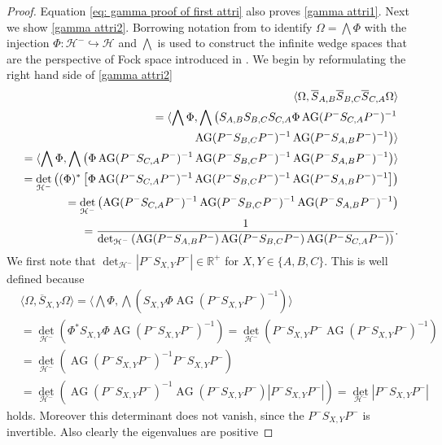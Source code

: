 \documentclass[b5paper,draft,openbib,12pt]{memoir}
\DeclareMathOperator{\AG}{AG}
\begin{document}
\begin{proof}
 Equation 
\eqref{eq: gamma proof of first attri} also proves \eqref{gamma attri1}. Next we show \eqref{gamma attri2}. 
Borrowing notation from \cite[section 2]{ivp0} to identify \(\Omega=\bigwedge \Phi\) with the injection \(\Phi: \mathcal{H}^-\hookrightarrow\mathcal{H}\)
and \(\bigwedge\) is used to construct the infinite wedge spaces that are the perspective of Fock space introduced in \cite{ivp0}. 
We begin by reformulating the right hand side of  \eqref{gamma attri2}
\begin{align}
 \langle \Omega, \overline{S}_{A,B} \overline{S}_{B,C} \overline{S}_{C,A}\Omega\rangle \\\notag
=\langle \bigwedge \Phi, \bigwedge \left(S_{A,B}S_{B,C}S_{C,A}\Phi \AG(P^-S_{C,A} P^-)^{-1}\right.\\
\left. \AG(P^-S_{B,C} P^-)^{-1} \AG(P^-S_{A,B} P^-)^{-1}  \right)\rangle \\
=\langle \bigwedge \Phi, \bigwedge \left(\Phi \AG(P^-S_{C,A} P^-)^{-1} \AG(P^-S_{B,C} P^-)^{-1} \AG(P^-S_{A,B} P^-)^{-1}  \right)\rangle \\
=\det_{\mathcal{H}^-}\left( (\Phi)^*  \left[\Phi \AG(P^- S_{C,A} P^-)^{-1} \AG(P^-S_{B,C} P^-)^{-1} \AG(P^-S_{A,B} P^-)^{-1} \right] \right)\\
=\det_{\mathcal{H}^-}\left(  \AG(P^- S_{C,A} P^-)^{-1} \AG(P^- S_{B,C} P^-)^{-1} \AG(P^-S_{A,B} P^-)^{-1}  \right)\\\label{eq:1/arg}
=\frac{1}{\det_{\mathcal{H}^-}\left(  \AG(P^- S_{A,B} P^-) \AG(P^- S_{B,C} P^-) \AG(P^-S_{C,A} P^-)  \right)}.
\end{align}
We first note that \(\det_{\mathcal{H}^-}|P^- S_{X,Y}P^-|\in\mathbb{R}^+\) for \(X,Y\in \{A,B,C\}\). This is well defined because 
\begin{align}
&\langle \Omega, \overline{S}_{X,Y}\Omega\rangle
=\langle \bigwedge \Phi, \bigwedge(S_{X,Y}\Phi \AG(P^- S_{X,Y}P^-)^{-1})\rangle\\
&=\det_{\mathcal{H}^-} \left( \Phi^* S_{X,Y}\Phi \AG(P^- S_{X,Y}P^-)^{-1}\right)
=\det_{\mathcal{H}^-} \left( P^- S_{X,Y} P^- \AG(P^- S_{X,Y}P^-)^{-1}\right)\\
&=\det_{\mathcal{H}^-} \left(\AG(P^- S_{X,Y}P^-)^{-1} P^- S_{X,Y} P^- \right)\\
&=\det_{\mathcal{H}^-} \left(\AG(P^- S_{X,Y}P^-)^{-1} \AG(P^- S_{X,Y}P^-) |P^- S_{X,Y} P^-| \right)
=\det_{\mathcal{H}^-} |P^- S_{X,Y}P^-|
\end{align}
holds. Moreover this determinant does not vanish, since the \(P^- S_{X,Y}P^-\) is invertible. Also clearly the eigenvalues are positive

\end{proof}
\end{document}
